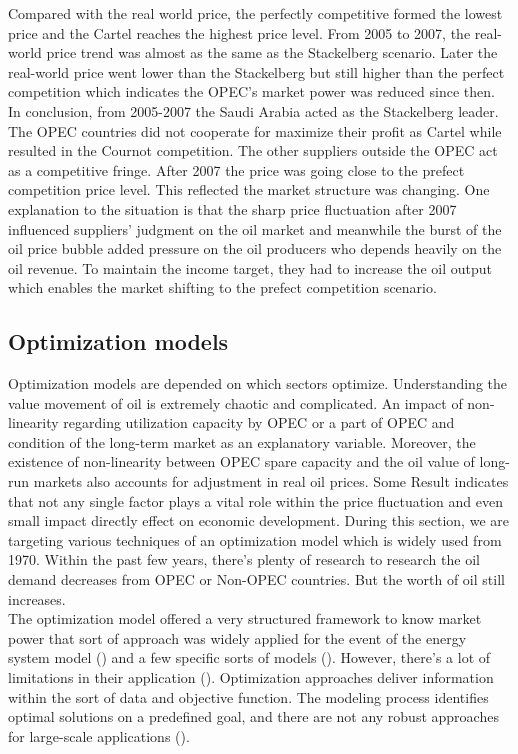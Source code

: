 Compared with the real world price, the perfectly competitive formed the lowest price and the Cartel reaches the highest price level. From 2005 to 2007, the real-world price trend was almost as the same as the Stackelberg scenario. Later the real-world price went lower than the Stackelberg but still higher than the perfect competition which indicates the OPEC's market power was reduced since then. In conclusion, from 2005-2007 the Saudi Arabia acted as the Stackelberg leader. The OPEC countries did not cooperate for maximize their profit as Cartel while resulted in the Cournot competition. The other suppliers outside the OPEC act as a competitive fringe. After 2007 the price was going close to the prefect competition price level. This reflected the market structure was changing. One explanation to the situation is that the sharp price fluctuation after 2007 influenced suppliers' judgment on the oil market and meanwhile the burst of the oil price bubble added pressure on the oil producers who depends heavily on the oil revenue. To maintain the income target, they had to increase the oil output which enables the market shifting to the prefect competition scenario.

\subsection{Optimization models}

Optimization models are depended on which sectors optimize. Understanding the value movement of oil is extremely chaotic and complicated. An impact of non-linearity regarding utilization capacity by OPEC or a part of OPEC and condition of the long-term market as an explanatory variable. Moreover, the existence of non-linearity between OPEC spare capacity and the oil value of long-run markets also accounts for adjustment in real oil prices. Some Result indicates that not any single factor plays a vital role within the price fluctuation and even small impact directly effect on economic development. During this section, we are targeting various techniques of an optimization model which is widely used from 1970. Within the past few years, there's plenty of research to research the oil demand decreases from OPEC or Non-OPEC countries. But the worth of oil still increases.\\ 

The optimization model offered a very structured framework to know market power that sort of approach was widely applied for the event of the energy system model (\cite{hogan1975energy}) and a few specific sorts of models (\cite{salant1982imperfect}). However, there's a lot of limitations in their application (\cite{huppmann2012crude}). Optimization approaches deliver information within the sort of data and objective function. The modeling process identifies optimal solutions on a predefined goal, and there are not any robust approaches for large-scale applications (\cite{lund2017simulation}).\\

